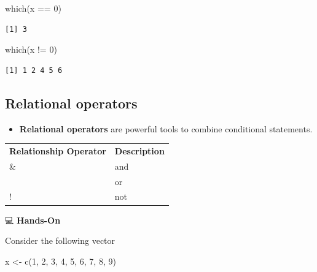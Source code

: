 \documentclass[
  letterpaper,
  DIV=11,
  numbers=noendperiod]{scrreprt}
\newenvironment{Shaded}{\begin{snugshade}}{\end{snugshade}}
\newcommand{\DecValTok}[1]{\textcolor[rgb]{0.68,0.00,0.00}{#1}}
\newcommand{\FunctionTok}[1]{\textcolor[rgb]{0.28,0.35,0.67}{#1}}
\newcommand{\NormalTok}[1]{\textcolor[rgb]{0.00,0.23,0.31}{#1}}
\newcommand{\OtherTok}[1]{\textcolor[rgb]{0.00,0.23,0.31}{#1}}
\newcommand{\SpecialCharTok}[1]{\textcolor[rgb]{0.37,0.37,0.37}{#1}}
\providecommand{\tightlist}{%
  \setlength{\itemsep}{0pt}\setlength{\parskip}{0pt}}\usepackage{longtable,booktabs,array}
\begin{document}
\begin{tcolorbox}
\begin{Shaded}
\begin{Highlighting}[]
\FunctionTok{which}\NormalTok{(x }\SpecialCharTok{==} \DecValTok{0}\NormalTok{)}
\end{Highlighting}
\end{Shaded}

\begin{verbatim}
[1] 3
\end{verbatim}

\begin{Shaded}
\begin{Highlighting}[]
\FunctionTok{which}\NormalTok{(x }\SpecialCharTok{!=} \DecValTok{0}\NormalTok{)}
\end{Highlighting}
\end{Shaded}

\begin{verbatim}
[1] 1 2 4 5 6
\end{verbatim}

\end{tcolorbox}

\subsection{Relational operators}\label{relational-operators}

\begin{itemize}
\tightlist
\item
  \textbf{Relational operators} are powerful tools to combine
  conditional statements.
\end{itemize}

\begin{longtable}[]{@{}ll@{}}
\toprule\noalign{}
\endhead
\bottomrule\noalign{}
\endlastfoot
\textbf{Relationship Operator} & \textbf{Description} \\
\& & and \\
\textbar{} & or \\
! & not \\
\end{longtable}

💻 \textbf{Hands-On}

Consider the following vector

\begin{Shaded}
\begin{Highlighting}[]
\NormalTok{x }\OtherTok{\textless{}{-}} \FunctionTok{c}\NormalTok{(}\DecValTok{1}\NormalTok{, }\DecValTok{2}\NormalTok{, }\DecValTok{3}\NormalTok{, }\DecValTok{4}\NormalTok{, }\DecValTok{5}\NormalTok{, }\DecValTok{6}\NormalTok{, }\DecValTok{7}\NormalTok{, }\DecValTok{8}\NormalTok{, }\DecValTok{9}\NormalTok{)}
\end{Highlighting}
\end{Shaded}
\end{document}
